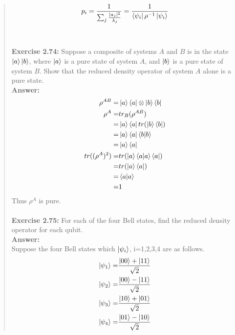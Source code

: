 \documentclass[UTF8]{ctexart}
\begin{document}
\begin{quote}
\begin{equation}
	\begin{aligned}
		p_{i}=\frac{1}{\sum_{j}\frac{|a_{j}|^{2}}{\lambda_{j}}}=\frac{1}{\bra{\psi_{i}}\rho^{-1}\ket{\psi_{i}}}
	\end{aligned}
\end{equation}
 \\
\\
\textbf{Exercise 2.74: } Suppose a composite of systems $A$ and $B$ is in the state $\ket{a}\ket{b}$, 
where $\ket{a}$ is a pure state of system $A$, and $\ket{b} $ is a pure state of system $B$. 
Show that the reduced density operator of system $A$ alone is a pure state.\\
\textbf{Answer:}\\
\begin{equation}
	\begin{aligned}
		\rho^{AB}=&\ket{a}\bra{a}\otimes \ket{b}\bra{b} \\
		 \rho^{A}=&tr_{B}(\rho^{AB}) \\
				  =&\ket{a}\bra{a}tr(\ket{b}\bra{b}) \\
				  =&\ket{a}\bra{a}\bra{b}\ket{b} \\
				  =&\ket{a}\bra{a} \\
 tr( (\rho^{A})^{2})=&tr(\ket{a}\bra{a}\ket{a}\bra{a}) \\
				  =&tr(\ket{a}\bra{a})\\
				  =&\bra{a}\ket{a} \\
				  =&1 \\
	\end{aligned}
\end{equation}
Thus $\rho^{A}$ is pure.
	\\
	\\
\textbf{Exercise 2.75: } 
For each of the four Bell states, find the reduced density operator for each qubit.
\\
\textbf{Answer:}\\
Suppose the four Bell states which $\ket{\psi_{i}}$, i=1,2,3,4 are as follows.\\
\begin{equation}
	\begin{aligned}
		\ket{\psi_{1}}=&\frac{\ket{00}+\ket{11}}{\sqrt{2}}\\
		\ket{\psi_{2}}=&\frac{\ket{00}-\ket{11}}{\sqrt{2}}\\
		\ket{\psi_{3}}=&\frac{\ket{10}+\ket{01}}{\sqrt{2}}\\
		\ket{\psi_{4}}=&\frac{\ket{01}-\ket{10}}{\sqrt{2}}\\

\end{aligned}
\end{equation}
\end{quote}
\end{document}
